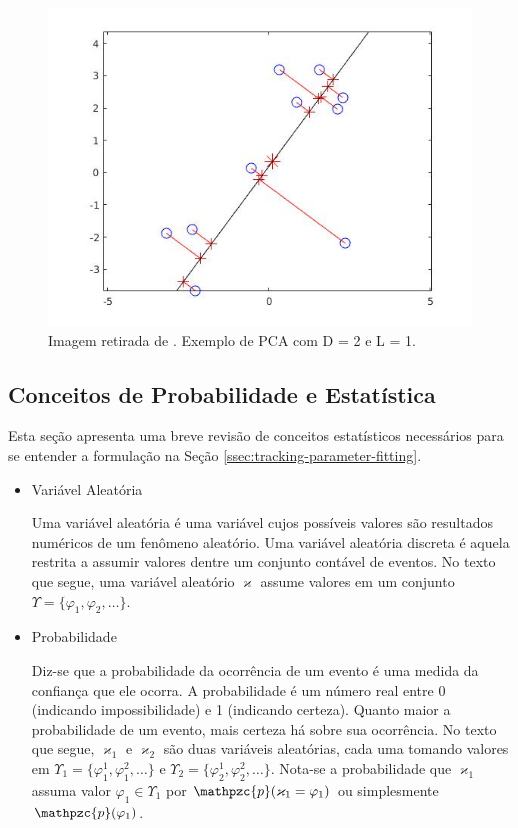 {\begin{figure}[!htb]
    \centering
    \includegraphics[width=0.8\linewidth]{./figs/pcaDemo.jpg}
% 
    \caption{Imagem retirada de \cite{machine-learning-book}. Exemplo de PCA com D = 2 e L = 1.}
    \label{fig:PCA}
\end{figure}





\subsection{Conceitos de Probabilidade e Estatística}
\label{ssec:review-probabilidade}

Esta seção apresenta uma breve revisão de conceitos estatísticos necessários para se entender a formulação na Seção \ref{ssec:tracking-parameter-fitting}.

\begin{itemize}

\item Variável Aleatória

Uma variável aleatória é uma variável cujos possíveis valores são resultados numéricos de um fenômeno aleatório. Uma variável aleatória discreta é aquela restrita a assumir valores dentre um conjunto contável de eventos. No texto que segue, uma variável aleatório $\varkappa$ assume valores em um conjunto $\Upsilon = \{\varphi_1, \varphi_2, \ldots\}$.

\item Probabilidade

Diz-se que a probabilidade da ocorrência de um evento é uma medida da confiança que ele ocorra. A probabilidade é um número real entre 0 (indicando impossibilidade) e 1 (indicando certeza). Quanto maior a probabilidade de um evento, mais certeza há sobre sua ocorrência. No texto que segue, $\varkappa_1$ e $\varkappa_2$ são duas variáveis aleatórias, cada uma tomando valores em $\Upsilon _1 = \{\varphi_1^1, \varphi_1^2, \ldots\}$ e $\Upsilon_2 = \{\varphi_2^1, \varphi_2^2, \ldots\}$. Nota-se a probabilidade que $\varkappa_1$ assuma valor $\varphi_1 \in \Upsilon_1$ por $\mathpzc{p}(\varkappa_1 = \varphi_1)$ ou simplesmente $\mathpzc{p}(\varphi_1)$.


\end{itemize}}
